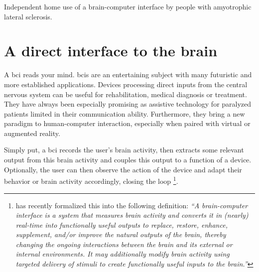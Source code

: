 Independent home use of a brain-computer interface by people with
amyotrophic lateral sclerosis.

\section{A direct interface to the brain}
A \ac{bci} reads your mind.
\ac{bci}s are an entertaining subject with many futuristic and more established
applications.
Devices processing direct inputs from the central nervous system can be
useful for rehabilitation, medical diagnosis or treatment.
They have always been especially promising as assistive technology for
paralyzed patients limited in their communication ability. 
Furthermore, they bring a new paradigm to human-computer interaction,
especially when paired with virtual or augmented reality.

Simply put, a \ac{bci} records the user's brain activity, then extracts some
relevant output from this brain activity and couples this output to a function
of a device.
Optionally, the user can then observe the action of the device and adapt their
behavior or brain activity accordingly, closing the loop
\footnote{
  \textcite{BCISociety2024} has recently formalized this into the
  following definition:
  \it``A brain-computer interface is a system that measures brain activity and
  converts it in (nearly) real-time into functionally useful outputs to replace,
  restore, enhance, supplement, and/or improve the natural outputs of the brain,
  thereby changing the ongoing interactions between the brain and its external or
  internal environments. It may additionally modify brain activity using targeted
  delivery of stimuli to create functionally useful inputs to the
  brain.''
}.

